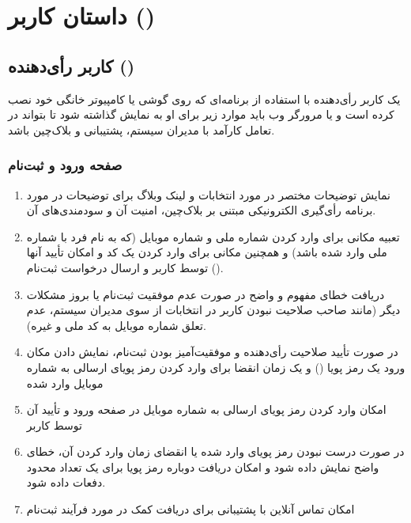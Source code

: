 \documentclass[12pt]{article}
\begin{document}
\section{داستان کاربر ()}

\subsection{کاربر رأی‌دهنده ()}
یک کاربر رأی‌دهنده با استفاده از برنامه‌ای که روی گوشی یا کامپیوتر خانگی خود نصب کرده است و یا مرورگر وب باید موارد زیر برای او به نمایش گذاشته شود تا بتواند در تعامل کارآمد با مدیران سیستم، پشتیبانی و بلاک‌چین باشد. 
  
\subsubsection{صفحه ورود و ثبت‌نام}
\begin{enumerate}[label=(\arabic*)]
\item
نمایش توضیحات مختصر در مورد انتخابات و لینک وبلاگ برای توضیحات در مورد برنامه رأی‌گیری الکترونیکی مبتنی بر بلاک‌چین، امنیت آن و سودمندی‌های آن. 
\item
تعبیه مکانی برای وارد کردن شماره ملی و شماره موبایل (که به نام فرد با شماره ملی وارد شده باشد) و همچنین مکانی  برای وارد کردن یک کد 
 و امکان تأیید آنها توسط کاربر و ارسال درخواست ثبت‌نام
(). 
\item
دریافت خطای مفهوم و واضح در صورت عدم موفقیت ثبت‌نام یا بروز مشکلات دیگر (مانند صاحب صلاحیت نبودن کاربر در انتخابات از سوی مدیران سیستم، عدم تعلق شماره موبایل به کد ملی و غیره).
\item
در صورت تأیید صلاحیت رأی‌دهنده و موفقیت‌آمیز بودن ثبت‌نام، نمایش دادن مکان ورود یک رمز پویا 
()
و یک زمان انقضا برای وارد کردن  رمز پویای ارسالی به شماره موبایل وارد شده 
\item
امکان وارد کردن رمز پویای ارسالی به شماره موبایل در صفحه ورود و تأیید آن توسط کاربر
\item
در صورت درست نبودن  رمز پویای وارد شده یا انقضای زمان وارد کردن آن، خطای واضح نمایش داده شود و امکان دریافت دوباره رمز پویا برای یک تعداد محدود دفعات داده شود. 
\item
امکان تماس آنلاین با پشتیبانی برای دریافت کمک در مورد فرآیند ثبت‌نام
\end{enumerate}
\end{document}
